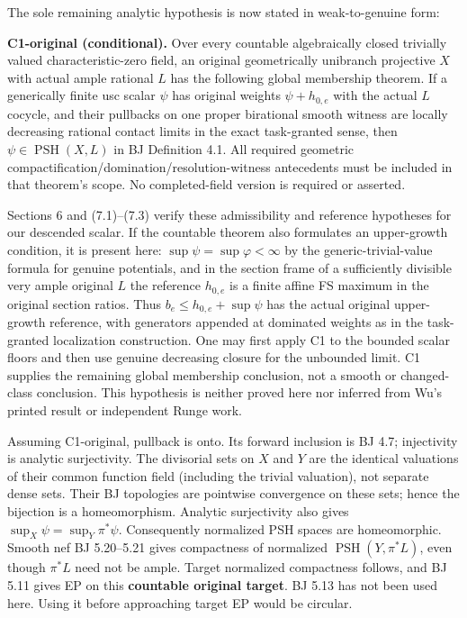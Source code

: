 \documentclass[
  10pt,
]{article}
\begin{document}
The sole remaining analytic hypothesis is now stated in weak-to-genuine
form:

\textbf{C1-original (conditional).} Over every countable algebraically
closed trivially valued characteristic-zero field, an original
geometrically unibranch projective \(X\) with actual ample rational
\(L\) has the following global membership theorem. If a generically
finite usc scalar \(\psi\) has original weights \(\psi+h_{0,e}\) with
the actual \(L\) cocycle, and their pullbacks on one proper birational
smooth witness are locally decreasing rational contact limits in the
exact task-granted sense, then \(\psi\in\operatorname{PSH}(X,L)\) in BJ
Definition 4.1. All required geometric
compactification/domination/resolution-witness antecedents must be
included in that theorem's scope. No completed-field version is required
or asserted.

Sections 6 and (7.1)--(7.3) verify these admissibility and reference
hypotheses for our descended scalar. If the countable theorem also
formulates an upper-growth condition, it is present here:
\(\sup\psi=\sup\varphi<\infty\) by the generic-trivial-value formula for
genuine potentials, and in the section frame of a sufficiently divisible
very ample original \(L\) the reference \(h_{0,e}\) is a finite affine
FS maximum in the original section ratios. Thus
\(b_e\le h_{0,e}+\sup\psi\) has the actual original upper-growth
reference, with generators appended at dominated weights as in the
task-granted localization construction. One may first apply C1 to the
bounded scalar floors and then use genuine decreasing closure for the
unbounded limit. C1 supplies the remaining global membership conclusion,
not a smooth or changed-class conclusion. This hypothesis is neither
proved here nor inferred from Wu's printed result or independent Runge
work.

Assuming C1-original, pullback is onto. Its forward inclusion is BJ 4.7;
injectivity is analytic surjectivity. The divisorial sets on \(X\) and
\(Y\) are the identical valuations of their common function field
(including the trivial valuation), not separate dense sets. Their BJ
topologies are pointwise convergence on these sets; hence the bijection
is a homeomorphism. Analytic surjectivity also gives
\(\sup_X\psi=\sup_Y\pi^*\psi\). Consequently normalized PSH spaces are
homeomorphic. Smooth nef BJ 5.20--5.21 gives compactness of normalized
\(\operatorname{PSH}(Y,\pi^*L)\), even though \(\pi^*L\) need not be
ample. Target normalized compactness follows, and BJ 5.11 gives EP on
this \textbf{countable original target}. BJ 5.13 has not been used here.
Using it before approaching target EP would be circular.
\end{document}
